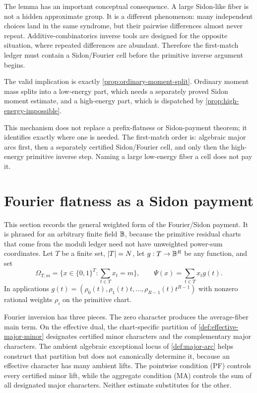 \documentclass[11pt,a4paper]{amsart}
\numberwithin{equation}{section}
\theoremstyle{remark}
\begin{document}
The lemma has an important conceptual consequence.  A large Sidon-like fiber is not a hidden approximate group.  It is a different phenomenon: many independent choices land in the same syndrome, but their pairwise differences almost never repeat.  Additive-combinatorics inverse tools are designed for the opposite situation, where repeated differences are abundant.  Therefore the first-match ledger must contain a Sidon/Fourier cell before the primitive inverse argument begins.

The valid implication is exactly \cref{prop:ordinary-moment-split}.  Ordinary
moment mass splits into a low-energy part, which needs a separately proved
Sidon moment estimate, and a high-energy part, which is dispatched by
\cref{prop:high-energy-impossible}.

This mechanism does not replace a prefix-flatness or Sidon-payment theorem;
it identifies exactly where one is needed.  The first-match order is:
algebraic major arcs first, then a separately certified Sidon/Fourier cell,
and only then the high-energy primitive inverse step.  Naming a large
low-energy fiber a cell does not pay it.

\section{Fourier flatness as a Sidon payment}\label{sec:fourier}\label{sec:sidon-closure}

This section records the general weighted form of the Fourier/Sidon payment.  It is phrased for an arbitrary finite field \(\mathbb B\), because the primitive residual charts that come from the moduli ledger need not have unweighted power-sum coordinates.  Let \(T\) be a finite set, \(\lvert T\rvert=N\), let \(g:T\to\mathbb B^R\) be any function, and set
\[
        \Omega_{T,m}=\{x\in\{0,1\}^T: \sum_{t\in T}x_t=m\},
        \qquad
        \Psi(x)=\sum_{t\in T}x_tg(t).
\]
In applications \(g(t)=(\rho_0(t),\rho_1(t)t,\ldots,\rho_{R-1}(t)t^{R-1})\) with nonzero rational weights \(\rho_i\) on the primitive chart.

Fourier inversion has three pieces.  The zero character produces the
average-fiber main term.  On the effective dual, the chart-specific
partition of \cref{def:effective-major-minor} designates certified minor
characters and the complementary major characters.  The ambient algebraic
exceptional locus of \cref{def:major-arc} helps construct that partition
but does not canonically determine it, because an effective character has
many ambient lifts.  The pointwise condition \textup{(PF)} controls every
certified minor lift, while the aggregate condition \textup{(MA)} controls
the sum of all designated major characters.  Neither estimate substitutes
for the other.
\end{document}
